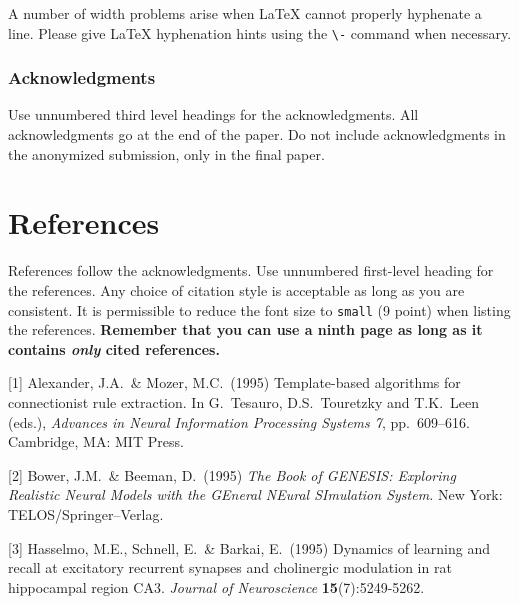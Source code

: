 \documentclass{article}
\begin{document}
A number of width problems arise when \LaTeX{} cannot properly
hyphenate a line. Please give LaTeX hyphenation hints using the
\verb+\-+ command when necessary.

\subsubsection*{Acknowledgments}

Use unnumbered third level headings for the acknowledgments. All
acknowledgments go at the end of the paper. Do not include
acknowledgments in the anonymized submission, only in the final paper.

\section*{References}

References follow the acknowledgments. Use unnumbered first-level
heading for the references. Any choice of citation style is acceptable
as long as you are consistent. It is permissible to reduce the font
size to \verb+small+ (9 point) when listing the references. {\bf
  Remember that you can use a ninth page as long as it contains
  \emph{only} cited references.}
\medskip

\small

[1] Alexander, J.A.\ \& Mozer, M.C.\ (1995) Template-based algorithms
for connectionist rule extraction. In G.\ Tesauro, D.S.\ Touretzky and
T.K.\ Leen (eds.), {\it Advances in Neural Information Processing
  Systems 7}, pp.\ 609--616. Cambridge, MA: MIT Press.

[2] Bower, J.M.\ \& Beeman, D.\ (1995) {\it The Book of GENESIS:
  Exploring Realistic Neural Models with the GEneral NEural SImulation
  System.}  New York: TELOS/Springer--Verlag.

[3] Hasselmo, M.E., Schnell, E.\ \& Barkai, E.\ (1995) Dynamics of
learning and recall at excitatory recurrent synapses and cholinergic
modulation in rat hippocampal region CA3. {\it Journal of
  Neuroscience} {\bf 15}(7):5249-5262.
\end{document}
